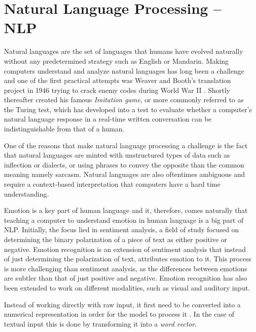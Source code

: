 \documentclass[nofilelist]{cslthse-msc}
\begin{document}
\section{Natural Language Processing -- NLP}
Natural languages are the set of languages that humans have evolved naturally without any predetermined strategy such as English or Mandarin. Making computers understand and analyze natural languages has long been a challenge and one of the first practical attempts was Weaver and Booth's translation project in 1946 trying to crack enemy codes during World War II \citep{Liddy2001NLP}. Shortly thereafter \citet{Turing1950} created his famous \textit{Imitation game}, or more commonly referred to as the Turing test, which has developed into a test to evaluate whether a computer's natural language response in a real-time written conversation can be indistinguishable from that of a human. 

One of the reasons that make natural language processing a challenge is the fact that natural languages are minted with unstructured types of data such as inflection or dialects, or using phrases to convey the opposite than the common meaning namely sarcasm. Natural languages are also oftentimes ambiguous and require a context-based interpretation that computers have a hard time understanding. 


Emotion is a key part of human language and it, therefore, comes naturally that teaching a computer to understand emotion in human language is a big part of NLP. Initially, the focus lied in sentiment analysis, a field of study focused on determining the binary polarization of a piece of text as either positive or negative. 
Emotion recognition is an extension of sentiment analysis that instead of just determining the polarization of text, attributes emotion to it. This process is more challenging than sentiment analysis, as the differences between emotions are subtler than that of just positive and negative. 
Emotion recognition has also been extended to work on different modalities, such as visual and auditory input.

Instead of working directly with raw input, it first need to be converted into a numerical representation in order for the model to process it \citep{franoischollet2017learning}. In the case of textual input this is done by transforming it into a \textit{word vector}.
\end{document}

